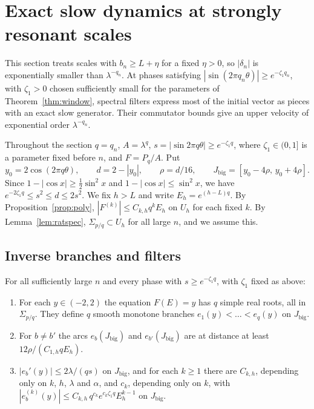 \section{Exact slow dynamics at strongly resonant scales}\label{sec:filters}

This section treats scales with $b_n\ge L+\eta$ for a fixed $\eta>0$, so $|\delta_n|$ is exponentially smaller than $\lambda^{-q_n}$. At phases satisfying $|\sin(2\pi q_n\theta)|\ge e^{-\zeta_1q_n}$, with $\zeta_1>0$ chosen sufficiently small for the parameters of Theorem~\ref{thm:window}, spectral filters express most of the initial vector as pieces with an exact slow generator. Their commutator bounds give an upper velocity of exponential order $\lambda^{-q_n}$.

Throughout the section $q=q_n$, $A=\lambda^q$, $s=|\sin2\pi q\theta|\ge e^{-\zeta_1q}$, where $\zeta_1\in(0,1]$ is a parameter fixed before $n$, and $F=P_q/A$. Put
\[
y_0=2\cos(2\pi q\theta),\qquad d=2-|y_0|,\qquad \rho=d/16,\qquad J_{\mathrm{big}}=[y_0-4\rho,\,y_0+4\rho].
\]
Since $1-|\cos x|\ge\frac12\sin^2x$ and $1-|\cos x|\le\sin^2x$, we have $e^{-2\zeta_1q}\le s^2\le d\le2s^2$. We fix $h>L$ and write $E_h=e^{(h-L)q}$. By Proposition~\ref{prop:poly}, $|F^{(k)}|\le C_{k,h}q^kE_h$ on $U_h$ for each fixed $k$. By Lemma~\ref{lem:ratspec}, $\Sigma_{p/q}\subset U_h$ for all large $n$, and we assume this.

\subsection{Inverse branches and filters}

\begin{lemma}\label{lem:branches}
For all sufficiently large $n$ and every phase with $s\ge e^{-\zeta_1q}$, with $\zeta_1$ fixed as above:
\begin{enumerate}
\item For each $y\in(-2,2)$ the equation $F(E)=y$ has $q$ simple real roots, all in $\Sigma_{p/q}$. They define $q$ smooth monotone branches $e_1(y)<\dots<e_q(y)$ on $J_{\mathrm{big}}$.
\item For $b\ne b'$ the arcs $e_b(J_{\mathrm{big}})$ and $e_{b'}(J_{\mathrm{big}})$ are at distance at least $12\rho/(C_{1,h}qE_h)$.
\item $|e_b'(y)|\le2\lambda/(qs)$ on $J_{\mathrm{big}}$, and for each $k\ge1$ there are $C_{k,h}$, depending only on $k$, $h$, $\lambda$ and $\alpha$, and $c_k$, depending only on $k$, with $|e_b^{(k)}(y)|\le C_{k,h}\,q^{c_k}e^{c_k\zeta_1q}E_h^{k-1}$ on $J_{\mathrm{big}}$.
\end{enumerate}
\end{lemma}

